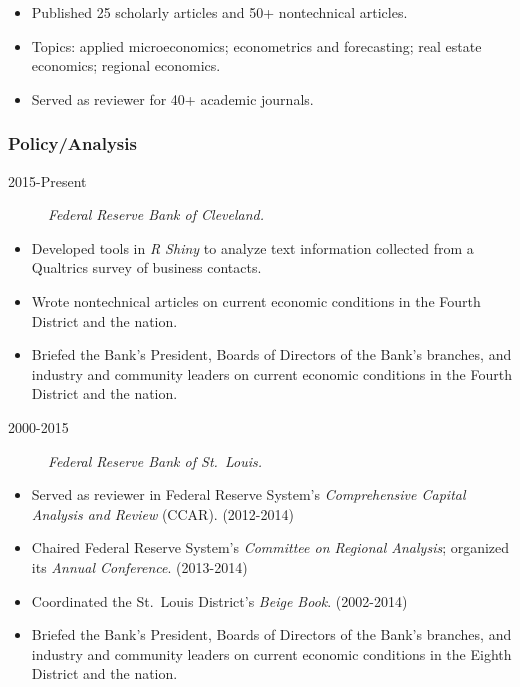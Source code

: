\documentclass[10pt,]{article}
\def\tightlist{}
\begin{document}
\begin{itemize}
\tightlist
\item
  Published 25 scholarly articles and 50+ nontechnical articles.
\item
  Topics: applied microeconomics; econometrics and forecasting; real
  estate economics; regional economics.
\item
  Served as reviewer for 40+ academic journals.
\end{itemize}

\hypertarget{policyanalysis}{%
\subsubsection{Policy/Analysis}\label{policyanalysis}}

\begin{description}
\tightlist
\item[2015-Present]
\emph{Federal Reserve Bank of Cleveland.}
\end{description}

\begin{itemize}
\tightlist
\item
  Developed tools in \emph{R Shiny} to analyze text information
  collected from a Qualtrics survey of business contacts.
\item
  Wrote nontechnical articles on current economic conditions in the
  Fourth District and the nation.
\item
  Briefed the Bank's President, Boards of Directors of the Bank's
  branches, and industry and community leaders on current economic
  conditions in the Fourth District and the nation.
\end{itemize}

\begin{description}
\tightlist
\item[2000-2015]
\emph{Federal Reserve Bank of St.~Louis.}
\end{description}

\begin{itemize}
\tightlist
\item
  Served as reviewer in Federal Reserve System's \emph{Comprehensive
  Capital Analysis and Review} (CCAR). (2012-2014)
\item
  Chaired Federal Reserve System's \emph{Committee on Regional
  Analysis}; organized its \emph{Annual Conference}. (2013-2014)
\item
  Coordinated the St.~Louis District's \emph{Beige Book}. (2002-2014)
\item
  Briefed the Bank's President, Boards of Directors of the Bank's
  branches, and industry and community leaders on current economic
  conditions in the Eighth District and the nation.
\end{itemize}
\end{document}
